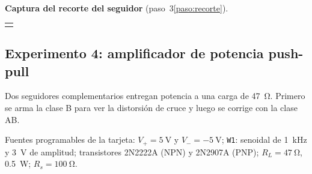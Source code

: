 \documentclass[11pt,a4paper]{article}
\newcommand{\cuadrorespuesta}{%
  \par\vspace{6pt}\noindent
  \begin{tabularx}{\linewidth}{|>{\centering\arraybackslash}X|}
    \hline
    \rule{0pt}{4.4cm}\raisebox{2.1cm}{\textcolor{black!45}{Figura}}\\
    \hline
    \rule{0pt}{2.0cm}\raisebox{0.9cm}{\textcolor{black!45}{Comentario}}\\
    \hline
  \end{tabularx}\par\vspace{8pt}%
}
\begin{document}
\noindent\begin{minipage}{\linewidth}
\noindent\textbf{Captura del recorte del seguidor} (paso~3\ref{paso:recorte}).
\cuadrorespuesta
\end{minipage}\par

\subsection{Experimento 4: amplificador de potencia push-pull}
Dos seguidores complementarios entregan potencia a una carga de \qty{47}{\ohm}. Primero se
arma la clase B para ver la distorsión de cruce y luego se corrige con la clase AB.

Fuentes programables de la tarjeta: $V_+ = \qty{+5}{\volt}$ y $V_- = \qty{-5}{\volt}$;
\texttt{W1}: senoidal de \qty{1}{\kilo\hertz} y \qty{3}{\volt} de amplitud; transistores
2N2222A (NPN) y 2N2907A (PNP); $R_L = \qty{47}{\ohm}$, \qty{0.5}{\watt};
$R_s = \qty{100}{\ohm}$.
\end{document}
